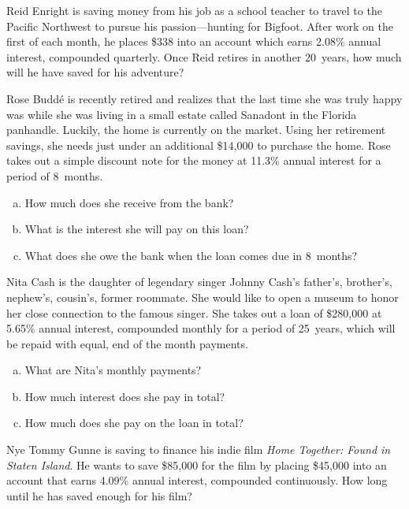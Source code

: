 \documentclass[12pt,letterpaper]{exam}
\begin{document}
\begin{questions}
\newpage
\question[15] Reid Enright is saving money from his job as a school teacher to travel to the Pacific Northwest to pursue his passion---hunting for Bigfoot. After work on the first of each month, he places \$338 into an account which earns 2.08\% annual interest, compounded quarterly. Once Reid retires in another 20~years, how much will he have saved for his adventure? 



\newpage
\question[12] Rose Budd\'e is recently retired and realizes that the last time she was truly happy was while she was living in a small estate called Sanadont in the Florida panhandle. Luckily, the home is currently on the market. Using her retirement savings, she needs just under an additional \$14,000 to purchase the home. Rose takes out a simple discount note for the money at 11.3\% annual interest for a period of 8~months. 
	\begin{enumerate}[(a)]
	\item How much does she receive from the bank?
	\item What is the interest she will pay on this loan?
	\item What does she owe the bank when the loan comes due in 8~months?
	\end{enumerate}



\newpage
\question[15] Nita Cash is the daughter of legendary singer Johnny Cash's father's, brother's, nephew's, cousin's, former roommate. She would like to open a museum to honor her close connection to the famous singer. She takes out a loan of \$280,000 at 5.65\% annual interest, compounded monthly for a period of 25~years, which will be repaid with equal, end of the month payments. 
	\begin{enumerate}[(a)]
	\item What are Nita's monthly payments?
	\item How much interest does she pay in total?
	\item How much does she pay on the loan in total?
	\end{enumerate}



\newpage
\question[15] Nye Tommy Gunne is saving to finance his indie film \textit{Home Together: Found in Staten Island}. He wants to save \$85,000 for the film by placing \$45,000 into an account that earns 4.09\% annual interest, compounded continuously. How long until he has saved enough for his film? 


\end{questions}
\end{document}
